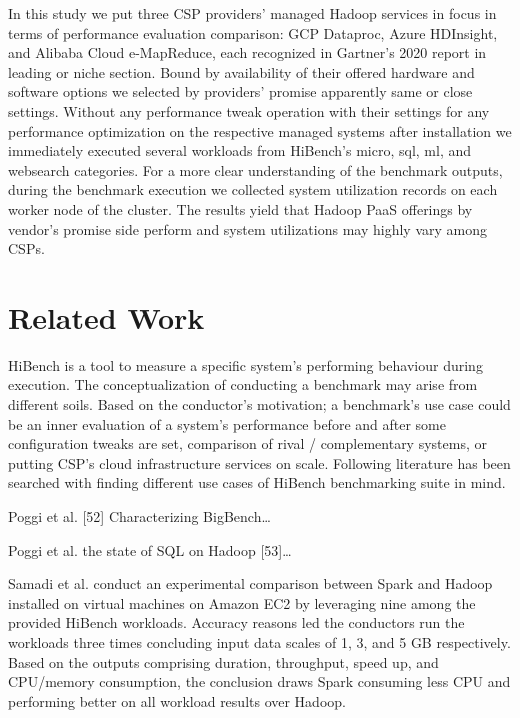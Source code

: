 \documentclass[review]{elsarticle}
\begin{document}
In this study we put three CSP providers' managed Hadoop services in focus in terms of performance evaluation comparison: GCP Dataproc, Azure HDInsight, and Alibaba Cloud e-MapReduce, each recognized in Gartner's 2020 report in leading or niche section. Bound by availability of their offered hardware and software options we selected by providers' promise apparently same or close settings. Without any performance tweak operation with their settings for any performance optimization on the respective managed systems after installation we immediately executed several workloads from HiBench's micro, sql, ml, and websearch categories. For a more clear understanding of the benchmark outputs, during the benchmark execution we collected system utilization records on each worker node of the cluster. The results yield that Hadoop PaaS offerings by vendor's promise side perform and system utilizations may highly vary among CSPs.

\section{Related Work}
HiBench is a tool to measure a specific system’s performing behaviour during execution. The conceptualization of conducting a benchmark may arise from different soils. Based on the conductor’s motivation; a benchmark’s use case could be an inner evaluation of a system’s performance before and after some configuration tweaks are set, comparison of rival / complementary systems, or putting CSP’s cloud infrastructure services on scale. Following literature has been searched with finding different use cases of HiBench benchmarking suite in mind. 

Poggi et al. [52] Characterizing BigBench…

Poggi et al. the state of SQL on Hadoop [53]…

Samadi et al. conduct an experimental comparison between Spark and Hadoop installed on virtual machines on Amazon EC2 by leveraging nine among the provided HiBench workloads. Accuracy reasons led the conductors run the workloads three times concluding input data scales of 1, 3, and 5 GB respectively. Based on the outputs comprising duration, throughput, speed up, and CPU/memory consumption, the conclusion draws Spark consuming less CPU and performing better on all workload results over Hadoop. 
\end{document}
